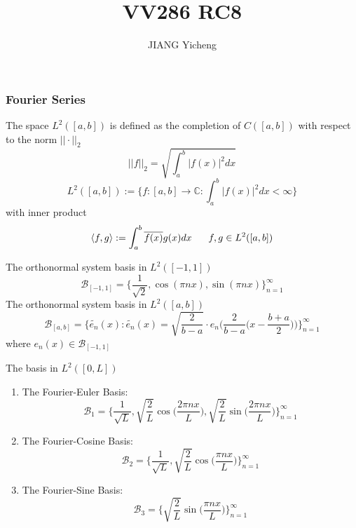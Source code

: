 \documentclass{beamer}
\title{\textcolor[rgb]{0,0.168,0.376}{VV286 RC8}}
\author{JIANG Yicheng}
\begin{document}
\begin{frame}
\titlepage
\end{frame}

\begin{frame}
\frametitle{Fourier Series}
The space $L^2([a,b])$ is defined as the completion of $C([a, b])$ with respect to the norm $||\cdot||_2$
$$||f||_2=\sqrt{\int_a^b|f(x)|^2dx}$$
$$L^2([a,b]):=\Big\lbrace f:[a,b]\rightarrow\mathbb{C}:\int_a^b|f(x)|^2dx<\infty\Big\rbrace$$
with inner product
$$\langle f,g\rangle:=\int_a^b\overline{f(x)}g(x)dx\hspace{6mm}f,g\in L^2([a,b])$$

\end{frame}

\begin{frame}
The orthonormal system basis in $L^2([-1,1])$
$$\mathcal{B}_{[-1,1]}=\Big\lbrace \dfrac{1}{\sqrt{2}},\cos(\pi nx),\sin(\pi nx)\Big\rbrace_{n=1}^{\infty}$$
The orthonormal system basis in $L^2([a,b])$
$$\mathcal{B}_{[a,b]}=\Big\lbrace \tilde{e_n}(x):\tilde{e_n}(x)=\sqrt{\dfrac{2}{b-a}}\cdot e_n\Big(\dfrac{2}{b-a}\Big(x-\dfrac{b+a}{2}\Big)\Big)\Big\rbrace_{n=1}^{\infty}$$
where $e_n(x)\in\mathcal{B}_{[-1,1]}$
\end{frame}

\begin{frame}
\begin{block}{The basis in $L^2([0,L])$}
\begin{enumerate}
\item The Fourier-Euler Basis:
$$\mathcal{B}_1=\Big\lbrace \dfrac{1}{\sqrt{L}},\sqrt{\dfrac{2}{L}}\cos\Big(\dfrac{2\pi nx}{L}\Big),\sqrt{\dfrac{2}{L}}\sin\Big(\dfrac{2\pi nx}{L}\Big)\Big\rbrace_{n=1}^{\infty}$$
\item The Fourier-Cosine Basis:
$$\mathcal{B}_2=\Big\lbrace \dfrac{1}{\sqrt{L}},\sqrt{\dfrac{2}{L}}\cos\Big(\dfrac{\pi nx}{L}\Big)\Big\rbrace_{n=1}^{\infty}$$
\item The Fourier-Sine Basis:
$$\mathcal{B}_3=\Big\lbrace \sqrt{\dfrac{2}{L}}\sin\Big(\dfrac{\pi nx}{L}\Big)\Big\rbrace_{n=1}^{\infty}$$
\end{enumerate}
\end{block}
\end{frame}
\end{document}
